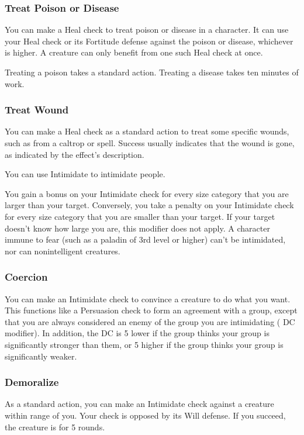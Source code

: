 \subsubsection{Treat Poison or Disease}
You can make a Heal check to treat poison or disease in a character. It can use your Heal check or its Fortitude defense against the poison or disease, whichever is higher. A creature can only benefit from one such Heal check at once.

Treating a poison takes a standard action. Treating a disease takes ten minutes of work.

\subsubsection{Treat Wound}
You can make a Heal check as a standard action to treat some specific wounds, such as from a caltrop or  spell. Success usually indicates that the wound is gone, as indicated by the effect's description.

You can use Intimidate to intimidate people.

You gain a  bonus on your Intimidate check for every size category that you are larger than your target. Conversely, you take a  penalty on your Intimidate check for every size category that you are smaller than your target. If your target doesn't know how large you are, this modifier does not apply. A character immune to fear (such as a paladin of 3rd level or higher) can't be intimidated, nor can nonintelligent creatures.

\subsubsection{Coercion}
You can make an Intimidate check to convince a creature to do what you want. This functions like a Persuasion check to form an agreement with a group, except that you are always considered an enemy of the group you are intimidating ( DC modifier). In addition, the DC is 5 lower if the group thinks your group is significantly stronger than them, or 5 higher if the group thinks your group is significantly weaker.

\subsubsection{Demoralize}\label{Demoralize}
As a standard action, you can make an Intimidate check against a creature within \rngmed range of you. Your check is opposed by its Will defense. If you succeed, the creature is \shaken for 5 rounds.

